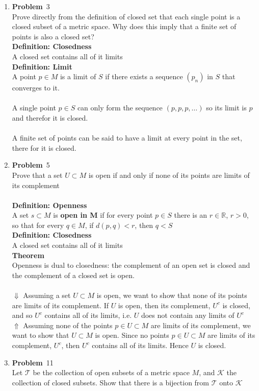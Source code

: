 \documentclass[12pt]{amsart}
\theoremstyle{definition}
\newcommand{\mbR}{\mathbb{R}}
\newcommand{\mc}[1]{\mathcal{#1}}
\newcommand{\itep}{\item {\bfseries Problem}\ }
\begin{document}
\begin{enumerate}[series=p]
\itep 3\\
Prove directly from the definition of closed set that each single point is a closed subset of a metric space.  Why does this imply that a finite set of points is also a closed set?
\\
\textbf{Definition: Closedness}\\
A closed set contains all of it limits\\
\textbf{Definition: Limit}\\
A point $p \in M$ is a limit of $S$ if there exists a sequence $(p_n)$ in $S$ that converges to it.\\
\\
A single point $p \in S$ can only form the sequence $(p, p, p, \dots)$ so its limit is $p$ and therefor it is closed.\\
\\
A finite set of points can be said to have a limit at every point in the set, there for it is closed.
\newpage


\itep 5\\
Prove that a set $U \subset M$ is open if and only if none of its points are limits of its complement
\\\\
\textbf{Definition: Openness}\\
A set $s \subset M$ is \textbf{open in M} if for every point $p \in S$ there is an $r \in \mbR$, $r>0$, so that for every $q \in M$,
if $d(p,q) < r$, then $q < S$
\\
\textbf{Definition: Closedness}\\
A closed set contains all of it limits\\
\textbf{Theorem}\\
Openness is dual to closedness:  the complement of an open set is closed and the complement of a closed set is open.\\
\\
$\Downarrow$ Assuming a set $U \subset M$ is open, we want to show that none of its points are limits of its complement.  If $U$ is open, then its complement, $U^c$ is closed, and so $U^c$ contains all of its limits, i.e. $U$ does not contain any limits of $U^c$\\
$\Uparrow$ Assuming none of the points $p \in U \subset M$ are limits of its complement, we want to show that $U \subset M$ is open.  Since no points $p \in U \subset M$ are limits of its complement, $U^c$, then $U^c$ contains all of its limits.  Hence $U$ is closed.
\newpage

\itep 11\\
Let $\mc{T}$ be the collection of open subsets of a metric space $M$, and $\mc{K}$ the collection of closed subsets.  Show that there is a bijection from $\mc{T}$ onto $\mc{K}$


\end{enumerate}
\end{document}

